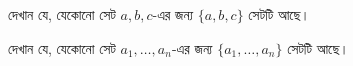 \documentclass[../../../include/open-logic-section]{subfiles}
\begin{document}
\begin{prob}
দেখান যে, যেকোনো সেট $a, b, c$-এর জন্য
$\{a, b, c\}$ সেটটি আছে।
\end{prob}

\begin{prob}
দেখান যে, যেকোনো সেট $a_1, \ldots, a_n$-এর
জন্য $\{a_1, \ldots, a_n\}$ সেটটি আছে।
\end{prob}

\end{document}
